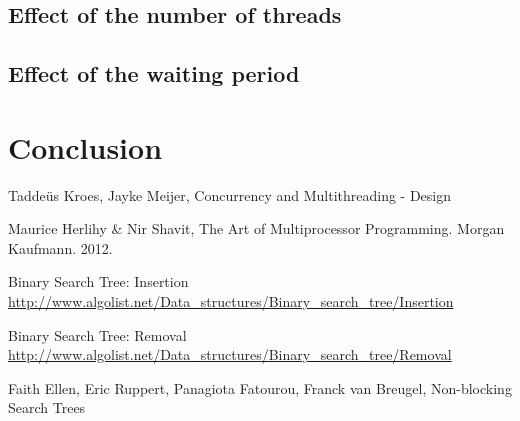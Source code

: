 \documentclass[a4paper]{article}
\begin{document}
\subsection{Effect of the number of threads}

\subsection{Effect of the waiting period}

\section{Conclusion}

\begin{thebibliography}{}    
    Taddeüs Kroes, Jayke Meijer, Concurrency and Multithreading - Design

    Maurice Herlihy \& Nir Shavit, The Art of Multiprocessor Programming. Morgan Kaufmann.         
    2012.

    Binary Search Tree: Insertion
    \url{http://www.algolist.net/Data_structures/Binary_search_tree/Insertion}
    
    Binary Search Tree: Removal
    \url{http://www.algolist.net/Data_structures/Binary_search_tree/Removal}

    Faith Ellen, Eric Ruppert, Panagiota Fatourou, Franck van Breugel, Non-blocking Search 
    Trees

\end{thebibliography}
\end{document}
